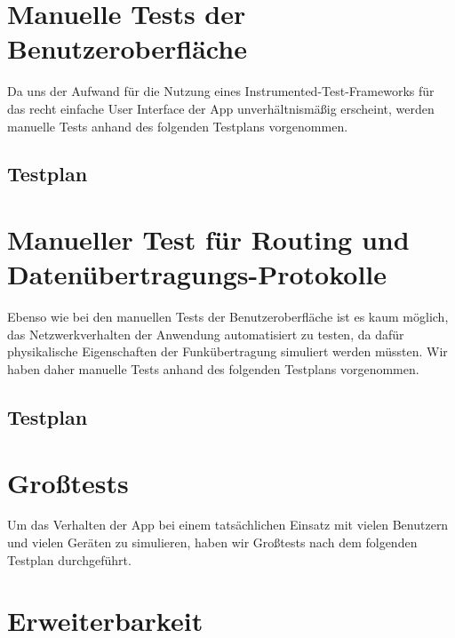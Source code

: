 \clearpage

\section{Manuelle Tests der Benutzeroberfläche}

Da uns der Aufwand für die Nutzung eines Instrumented-Test-Frameworks
für das recht einfache User Interface der App unverhältnismäßig
erscheint, werden manuelle Tests anhand des folgenden Testplans
vorgenommen.

\subsection{Testplan}





\clearpage
\section{Manueller Test für Routing und Datenübertragungs-Protokolle}

Ebenso wie bei den manuellen Tests der Benutzeroberfläche ist es kaum möglich, das Netzwerkverhalten der Anwendung automatisiert zu testen, da dafür physikalische Eigenschaften der Funkübertragung simuliert werden müssten. Wir haben daher manuelle Tests anhand des folgenden Testplans vorgenommen.

\subsection{Testplan}




\clearpage




\clearpage




\clearpage

\section{Großtests}

Um das Verhalten der App bei einem tatsächlichen Einsatz mit vielen Benutzern und vielen Geräten zu simulieren, haben wir Großtests nach dem folgenden Testplan durchgeführt.


\clearpage


\clearpage




\clearpage
\section{Erweiterbarkeit}


